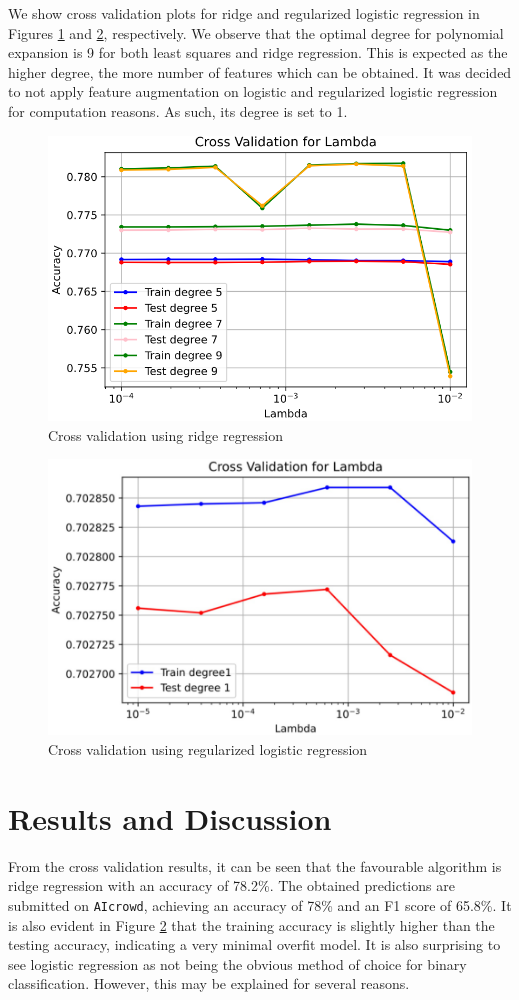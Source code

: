 \documentclass[10pt,conference,compsocconf]{IEEEtran}
\begin{document}
We show cross validation plots for ridge and regularized logistic regression in Figures \ref{fig:ridge} and \ref{fig:logistic}, respectively. We observe that the optimal degree for polynomial expansion is 9 for both least squares and ridge regression. This is expected as the higher degree, the more number of features which can be obtained. It was decided to not apply feature augmentation on logistic and regularized logistic regression for computation reasons. As such, its degree is set to 1.

\begin{figure}
  \centering\includegraphics[width=0.8\linewidth]{ridge_reg.png}
  \caption{Cross validation using ridge regression}
  \label{fig:ridge}
\end{figure}

\begin{figure}
  \centering\includegraphics[width=0.8\linewidth]{reg_logist.png}
  \caption{Cross validation using regularized logistic regression}
  \label{fig:logistic}
\end{figure}


\section{Results and Discussion}
\label{sec:results}
From the cross validation results, it can be seen that the favourable algorithm is ridge regression with an accuracy of 78.2\%. The obtained predictions are submitted on \texttt{AIcrowd}, achieving an accuracy of 78\% and an F1 score of 65.8\%. It is also evident in Figure \ref{fig:logistic} that the training accuracy is slightly higher than the testing accuracy, indicating a very minimal overfit model. It is also surprising to see logistic regression as not being the obvious method of choice for binary classification. However, this may be explained for several reasons.
\end{document}
